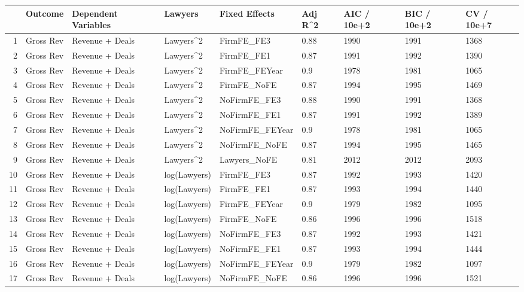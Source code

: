 \begin{table}[ht]
\centering
\begin{tabular}{rllllllll}
  \hline
 & Outcome & Dependent Variables & Lawyers & Fixed Effects & Adj R^2 & AIC / 10e+2 & BIC / 10e+2 & CV / 10e+7 \\ 
  \hline
1 & Gross Rev & Revenue + Deals & Lawyers^2 & FirmFE\_FE3 & 0.88 & 1990 & 1991 & 1368 \\ 
  2 & Gross Rev & Revenue + Deals & Lawyers^2 & FirmFE\_FE1 & 0.87 & 1991 & 1992 & 1390 \\ 
  3 & Gross Rev & Revenue + Deals & Lawyers^2 & FirmFE\_FEYear & 0.9 & 1978 & 1981 & 1065 \\ 
  4 & Gross Rev & Revenue + Deals & Lawyers^2 & FirmFE\_NoFE & 0.87 & 1994 & 1995 & 1469 \\ 
  5 & Gross Rev & Revenue + Deals & Lawyers^2 & NoFirmFE\_FE3 & 0.88 & 1990 & 1991 & 1368 \\ 
  6 & Gross Rev & Revenue + Deals & Lawyers^2 & NoFirmFE\_FE1 & 0.87 & 1991 & 1992 & 1389 \\ 
  7 & Gross Rev & Revenue + Deals & Lawyers^2 & NoFirmFE\_FEYear & 0.9 & 1978 & 1981 & 1065 \\ 
  8 & Gross Rev & Revenue + Deals & Lawyers^2 & NoFirmFE\_NoFE & 0.87 & 1994 & 1995 & 1465 \\ 
  9 & Gross Rev & Revenue + Deals & Lawyers^2 & Lawyers\_NoFE & 0.81 & 2012 & 2012 & 2093 \\ 
  10 & Gross Rev & Revenue + Deals & log(Lawyers) & FirmFE\_FE3 & 0.87 & 1992 & 1993 & 1420 \\ 
  11 & Gross Rev & Revenue + Deals & log(Lawyers) & FirmFE\_FE1 & 0.87 & 1993 & 1994 & 1440 \\ 
  12 & Gross Rev & Revenue + Deals & log(Lawyers) & FirmFE\_FEYear & 0.9 & 1979 & 1982 & 1095 \\ 
  13 & Gross Rev & Revenue + Deals & log(Lawyers) & FirmFE\_NoFE & 0.86 & 1996 & 1996 & 1518 \\ 
  14 & Gross Rev & Revenue + Deals & log(Lawyers) & NoFirmFE\_FE3 & 0.87 & 1992 & 1993 & 1421 \\ 
  15 & Gross Rev & Revenue + Deals & log(Lawyers) & NoFirmFE\_FE1 & 0.87 & 1993 & 1994 & 1444 \\ 
  16 & Gross Rev & Revenue + Deals & log(Lawyers) & NoFirmFE\_FEYear & 0.9 & 1979 & 1982 & 1097 \\ 
  17 & Gross Rev & Revenue + Deals & log(Lawyers) & NoFirmFE\_NoFE & 0.86 & 1996 & 1996 & 1521 \\ 

\end{tabular}
\end{table}

